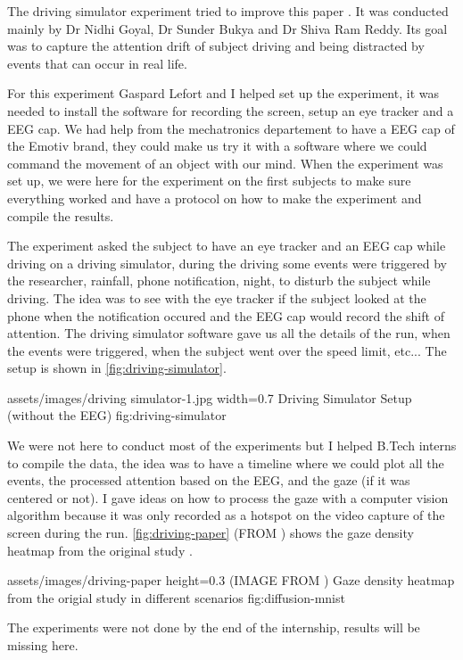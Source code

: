 The driving simulator experiment tried to improve this paper \cite{driving}. It
was conducted mainly by Dr Nidhi Goyal, Dr Sunder Bukya and Dr Shiva Ram Reddy.
Its goal was to capture the attention drift of subject driving and being
distracted by events that can occur in real life.

For this experiment Gaspard Lefort and I helped set up the
experiment, it was needed to install the software for recording the screen,
setup an eye tracker and a EEG cap. We had help from the mechatronics
departement to have a EEG cap of the Emotiv brand, they could make us try it
with a software where we could command the movement of an object with our mind.
When the experiment was set up, we were here for the experiment on the first
subjects to make sure everything worked and have a protocol on how to make the
experiment and compile the results.

The experiment asked the subject to have an eye tracker and an EEG cap while
driving on a driving simulator, during the driving some events were triggered by
the researcher, rainfall, phone notification, night, to disturb the subject
while driving. The idea was to see with the eye tracker if the subject looked at
the phone when the notification occured and the EEG cap would record the shift
of attention. The driving simulator software gave us all the details of the run,
when the events were triggered, when the subject went over the speed limit,
etc... The setup is shown in \cref{fig:driving-simulator}.

\insertfigure
    {assets/images/driving simulator-1.jpg}
    {width=0.7\textwidth}
    {Driving Simulator Setup (without the EEG)}
    {fig:driving-simulator}

We were not here to conduct most of the experiments but I helped B.Tech interns
to compile the data, the idea was to have a timeline where we could plot all the
events, the processed attention based on the EEG, and the gaze (if it was
centered or not). I gave ideas on how to process the gaze with a computer vision
algorithm because it was only recorded as a hotspot on the video capture of the
screen during the run. \cref{fig:driving-paper} (FROM \cite{driving}) shows the gaze density heatmap
from the original study \cite{driving}.

\insertfigure
    {assets/images/driving-paper}
    {height=0.3\textheight}
    {(IMAGE FROM \cite{driving}) Gaze density heatmap from the origial study in different scenarios}
    {fig:diffusion-mnist}

The experiments were not done by the end of the internship, results will be
missing here.